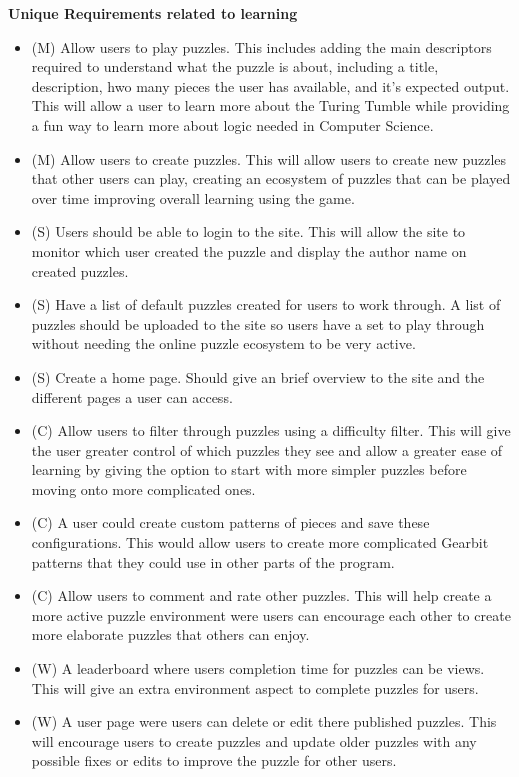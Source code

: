 \documentclass{l4proj}
\begin{document}
\textbf{Unique Requirements related to learning}
\begin{itemize}
    \item (M) Allow users to play puzzles. This includes adding the main descriptors required to understand what the puzzle is about, including a title, description, hwo many pieces the user has available, and it's expected output. This will allow a user to learn more about the Turing Tumble while providing a fun way to learn more about logic needed in Computer Science.
    \item (M) Allow users to create puzzles. This will allow users to create new puzzles that other users can play, creating an ecosystem of puzzles that can be played over time improving overall learning using the game.
    \item (S) Users should be able to login to the site. This will allow the site to monitor which user created the puzzle and display the author name on created puzzles.
    \item (S) Have a list of default puzzles created for users to work through. A list of puzzles should be uploaded to the site so users have a set to play through without needing the online puzzle ecosystem to be very active.
    \item (S) Create a home page. Should give an brief overview to the site and the different pages a user can access.
    \item (C) Allow users to filter through puzzles using a difficulty filter. This will give the user greater control of which puzzles they see and allow a greater ease of learning by giving the option to start with more simpler puzzles before moving onto more complicated ones.
    \item (C) A user could create custom patterns of pieces and save these configurations. This would allow users to create more complicated Gearbit patterns that they could use in other parts of the program.
    \item (C) Allow users to comment and rate other puzzles. This will help create a more active puzzle environment were users can encourage each other to create more elaborate puzzles that others can enjoy.
    \item (W) A leaderboard where users completion time for puzzles can be views. This will give an extra environment aspect to complete puzzles for users.
    \item (W) A user page were users can delete or edit there published puzzles. This will encourage users to create puzzles and update older puzzles with any possible fixes or edits to improve the puzzle for other users.
\end{itemize}
\end{document}
